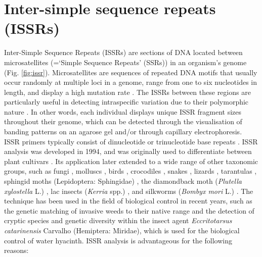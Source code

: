 \section{Inter-simple sequence repeats (ISSRs)}

Inter-Simple Sequence Repeats (ISSRs) are sections of DNA located between microsatellites (=‘Simple Sequence Repeats’ (SSRs)) in an organism's genome \citep{Zietkiewicz1994, wolfe2005issr, Gaskin2011} (Fig. \ref{fig:issr}). Microsatellites are sequences of repeated DNA motifs that usually occur randomly at multiple loci in a genome, range from one to six nucleotides in length, and display a high mutation rate \citep{Gaskin2011, Hoy2013}. The ISSRs between these regions are particularly useful in detecting intraspecific variation due to their polymorphic nature \citep{Abbot2001}. In other words, each individual displays unique ISSR fragment sizes throughout their genome, which can be detected through the visualisation of banding patterns on an agarose gel and/or through capillary electrophoresis. ISSR primers typically consist of dinucleotide or trinucleotide base repeats \citep{wolfe2005issr}. ISSR analysis was developed in 1994, and was originally used to differentiate between plant cultivars \citep{wolfe2005issr}. Its application later extended to a wide range of other taxonomic groups, such as fungi \citep{kerrigan2003ascobotryozyma}, molluscs \citep{casu2005fine, casu2006inter}, birds \citep{haig2003parentage, wink2006use}, crocodiles \citep{machkour2009between}, snakes \citep{guicking2006introduced, nagy2007species}, lizards \citep{joger2007phylogeography}, tarantulas \citep{machkour2009issr}, sphingid moths (Lepidoptera: Sphingidae) \citep{hundsdoerfer2006incongruence}, the diamondback moth (\textit{Plutella xylostella} L.) \citep{roux2007issr}, lac insects (\textit{Kerria} spp.) \citep{saha2011genetic}, and silkworms (\textit{Bombyx mori} L.) \citep{chatterjee2003identification}. The technique has been used in the field of biological control in recent years, such as the genetic matching of invasive weeds to their native range \citep{paterson2013issrs, barker2015barcoding, Sutton2017GeneticAgents} and the detection of cryptic species \citep{Paterson2016} and genetic diversity \citep{Taylor2011GeneticMiridae} within the insect agent \textit{Eccritotarsus catarinensis} Carvalho (Hemiptera: Miridae), which is used for the biological control of water hyacinth. 
ISSR analysis is advantageous for the following reasons: \vspace{0.4cm}

